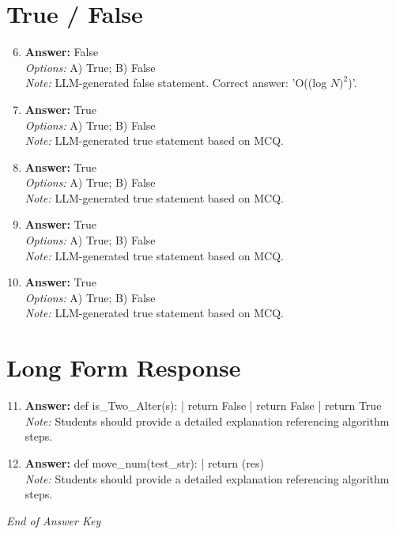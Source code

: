 \documentclass[12pt]{article}
\begin{document}
\section*{True / False}
\begin{enumerate}[label=\arabic*.]
\setcounter{enumi}{5}
\item \textbf{Answer:} False
\\ \textit{Options:} A) True; B) False
\\ \textit{Note:} LLM-generated false statement. Correct answer: 'O((log $N)^2$)'.
\item \textbf{Answer:} True
\\ \textit{Options:} A) True; B) False
\\ \textit{Note:} LLM-generated true statement based on MCQ.
\item \textbf{Answer:} True
\\ \textit{Options:} A) True; B) False
\\ \textit{Note:} LLM-generated true statement based on MCQ.
\item \textbf{Answer:} True
\\ \textit{Options:} A) True; B) False
\\ \textit{Note:} LLM-generated true statement based on MCQ.
\item \textbf{Answer:} True
\\ \textit{Options:} A) True; B) False
\\ \textit{Note:} LLM-generated true statement based on MCQ.
\end{enumerate}

\section*{Long Form Response}
\begin{enumerate}[label=\arabic*.]
\setcounter{enumi}{10}
\item \textbf{Answer:} def is\_Two\_Alter(s): | return False | return False | return True
\\ \textit{Note:} Students should provide a detailed explanation referencing algorithm steps.
\item \textbf{Answer:} def move\_num(test\_str): | return (res)
\\ \textit{Note:} Students should provide a detailed explanation referencing algorithm steps.
\end{enumerate}

\vfill
\noindent\textit{End of Answer Key}
\end{document}
